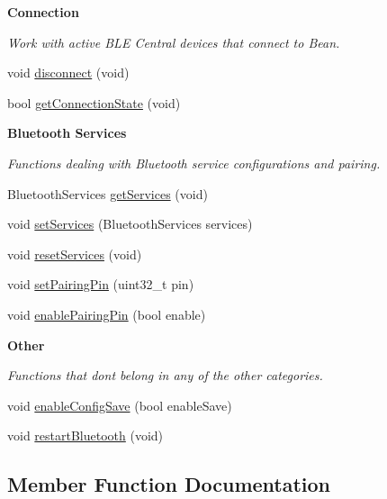 \begin{Indent}{\bf Connection}\par
{\em Work with active B\+L\+E Central devices that connect to Bean. }\begin{DoxyCompactItemize}
\item 
void \hyperlink{class_bean_class_a1509dbbc3ddbd08725e2cb65a9289e90}{disconnect} (void)
\item 
bool \hyperlink{class_bean_class_ab426b11e8bee60de92707254c0501c20}{get\+Connection\+State} (void)
\end{DoxyCompactItemize}
\end{Indent}
\begin{Indent}{\bf Bluetooth Services}\par
{\em Functions dealing with Bluetooth service configurations and pairing. }\begin{DoxyCompactItemize}
\item 
Bluetooth\+Services \hyperlink{class_bean_class_ae2547ba8f4b67a9ac774ce6d89b14dcb}{get\+Services} (void)
\item 
void \hyperlink{class_bean_class_a17b6e95f7b93e39ae83971ed796edd5b}{set\+Services} (Bluetooth\+Services services)
\item 
void \hyperlink{class_bean_class_a98a040220137d9dd047250e247bd4ebd}{reset\+Services} (void)
\item 
void \hyperlink{class_bean_class_a11cb6a1ec42d1af44af840dff1875d00}{set\+Pairing\+Pin} (uint32\+\_\+t pin)
\item 
void \hyperlink{class_bean_class_afff90ba1cdb690b88c1b8b4917e71b32}{enable\+Pairing\+Pin} (bool enable)
\end{DoxyCompactItemize}
\end{Indent}
\begin{Indent}{\bf Other}\par
{\em Functions that don\textquotesingle{}t belong in any of the other categories. }\begin{DoxyCompactItemize}
\item 
void \hyperlink{class_bean_class_a2ae5aa1b912ca67715670f1dea865431}{enable\+Config\+Save} (bool enable\+Save)
\item 
void \hyperlink{class_bean_class_a8823b48c41914a1a32d6dd3974ebf57d}{restart\+Bluetooth} (void)
\end{DoxyCompactItemize}
\end{Indent}


\subsection{Member Function Documentation}
\hypertarget{class_bean_class_a3e743eb8cc8e5e04364f53801b8fe83e}{}
